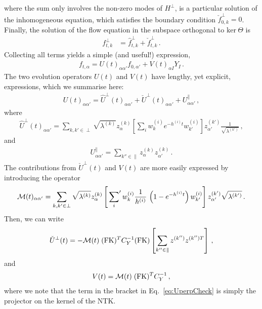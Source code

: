 where the sum only involves the non-zero modes of $H^\perp$,
is a particular solution of the inhomogeneous equation, which satisfies the boundary
condition $\check{f}^{\perp}_{0,k}=0$. Finally, the solution of the flow equation in the subspace orthogonal to
$\text{ker}\ \Theta$ is
\begin{align}
    f^\perp_{t,k}
    \label{eq:FlowSolution}
        &= \hat{f}^\perp_{t,k} + \check{f}^\perp_{t,k}
        \, .
\end{align}
Collecting all terms yields a simple (and useful!) expression,
\begin{align}
    \label{eq:AnalyticSol}
    f_{t,\alpha}
        = U(t)_{\alpha\alpha'} f_{0,\alpha'} + V(t)_{\alpha I} Y_{I}\, .
\end{align}
The two evolution operators $U(t)$ and $V(t)$ have lengthy, yet explicit, expressions, which we
summarise here: 
\begin{align}
    U(t)_{\alpha\alpha'} = \hat{U}^\perp(t)_{\alpha\alpha'}
        + \check{U}^\perp(t)_{\alpha\alpha'} + U^\parallel_{\alpha\alpha'}\, ,
\end{align}
where
\begin{align}
    \hat{U}^\perp(t)_{\alpha\alpha'}
        = \sum_{k,k'\in\perp} \sqrt{\lambda^{(k)}} z^{(k)}_\alpha 
            \left[\sum_i w^{(i)}_{k} e^{-h^{(i)}t} w^{(i)}_{k'}\right]
            z^{(k')}_{\alpha'} \frac{1}{\sqrt{\lambda^{(k')}}}\, ,
\end{align}
and
\begin{align}
    U^\parallel_{\alpha\alpha'}
        = \sum_{k''\in\parallel} z^{(k)}_\alpha z^{(k)}_{\alpha'} \, .
\end{align}
The contributions from $\check{U}^\perp(t)$ and $V(t)$ are more easily expressed by
introducing the operator
\begin{align}
    \label{eq:MOperatorDef}
    \mathcal{M}(t)_{\alpha\alpha'} 
        = \sum_{k,k'\in\perp} \sqrt{\lambda^{(k)}} z^{(k)}_\alpha 
            \left[\sideset{}{'}\sum_{i} w^{(i)}_{k} \frac{1}{h^{(i)}}\, 
            \left( 1- e^{-h^{(i)}t}\right) w^{(i)}_{k'}\right]
            z^{(k')}_{\alpha'} \sqrt{\lambda^{(k')}}\,. 
\end{align}
Then, we can write
\begin{align}
    \label{eq:UperpCheck}
    \check{U}^\perp(t)
        = - \mathcal{M}(t)\; (\mathrm{FK})^T C_Y^{-1} (\mathrm{FK}) 
            \left[\sum_{k''\in\parallel} z^{(k'')} z^{(k'') T}\right]\, ,
\end{align}
and
\begin{align}
    V(t) = \mathcal{M}(t)\; (\mathrm{FK})^T C_Y^{-1}\, ,
\end{align}
where we note that the term in the bracket in Eq.~\eqref{eq:UperpCheck} is simply the projector on the 
kernel of the NTK. 

